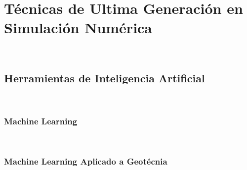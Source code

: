 %





\chapter{Técnicas de Ultima Generación en Simulación Numérica}~\hypertarget{ch:chapter_04}{}
\label{ch:chapter_04}

\lipsum[1-2]

\bigskip



\section{Herramientas de Inteligencia Artificial}~\hypertarget{sec:sec410}{}
\label{sec:sec410}

\lipsum[3-4]

\bigskip

\subsection{Machine Learning}~\hypertarget{sec:sec411}{}
\label{sec:sec411}


\subsection{Machine Learning Aplicado a Geotécnia}~\hypertarget{sec:sec412}{}
\label{sec:sec412}


